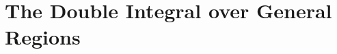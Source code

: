 \documentclass[a4paper, 11pt]{article}
\begin{document}
\maketitle
\thispagestyle{firstpage}

\setcounter{section}{10}
\setcounter{question}{96}

\section{The Double Integral over General Regions}

\end{document}
